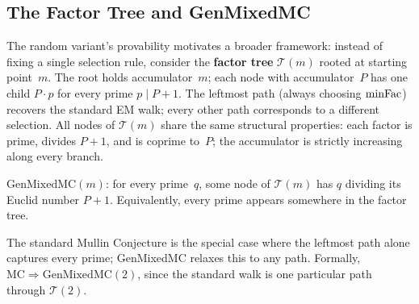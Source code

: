 \subsection{The Factor Tree and GenMixedMC}
\label{sec:factor-tree}

The random variant's provability motivates a broader framework:
instead of fixing a single selection rule, consider the
\textbf{factor tree} $\mathcal{T}(m)$ rooted at starting point~$m$.
The root holds accumulator~$m$; each node with accumulator~$P$ has
one child $P \cdot p$ for every prime $p \mid P{+}1$.
The leftmost path (always choosing $\mathrm{minFac}$) recovers the standard EM
walk; every other path corresponds to a different selection.
All nodes of $\mathcal{T}(m)$ share the same structural properties:
each factor is prime, divides $P{+}1$, and is coprime to~$P$; the
accumulator is strictly increasing along every branch.

\begin{definition}[GenMixedMC]
\label{def:gen-mixed-mc}
$\mathrm{GenMixedMC}(m)$: for every prime~$q$, some node of
$\mathcal{T}(m)$ has $q$ dividing its Euclid number $P{+}1$.
Equivalently, every prime appears somewhere in the factor tree.
\end{definition}

\noindent
The standard Mullin Conjecture is the special case where the
leftmost path alone captures every prime; GenMixedMC relaxes this to
any path.  Formally, $\mathrm{MC} \Longrightarrow
\mathrm{GenMixedMC}(2)$, since the standard walk is one particular
path through $\mathcal{T}(2)$.

